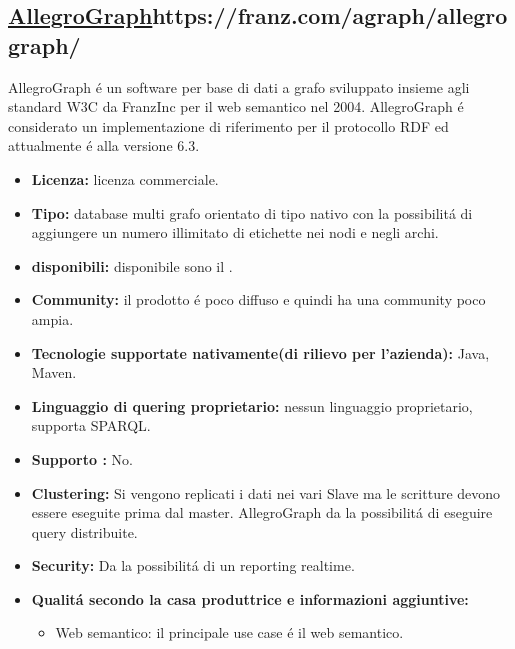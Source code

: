 \subsection{\url{AllegroGraph}{https://franz.com/agraph/allegrograph/}}
AllegroGraph \'e un software per base di dati a grafo  sviluppato insieme agli standard W3C da FranzInc per il web semantico nel 2004. AllegroGraph \'e considerato un implementazione di riferimento per il protocollo RDF ed attualmente \'e alla versione 6.3.
\begin{itemize}
\item \textbf{Licenza:} licenza commerciale.
\item \textbf{Tipo:} database multi grafo orientato di tipo nativo con la possibilit\'a di aggiungere un numero illimitato di etichette nei nodi e negli archi.
\item \textbf{ disponibili:} disponibile sono il .
\item \textbf{Community:} il prodotto \'e poco diffuso e quindi ha una community poco ampia.
\item \textbf{Tecnologie supportate nativamente(di rilievo per l'azienda):} Java, Maven. 
\item\textbf{Linguaggio di quering proprietario:} nessun linguaggio proprietario, supporta SPARQL.
\item\textbf{Supporto :} No.

\item\textbf{Clustering:} Si vengono replicati i dati nei vari Slave ma le scritture devono essere eseguite prima dal master. AllegroGraph da la possibilit\'a di eseguire query distribuite.
\item\textbf{Security:} Da la possibilit\'a di un reporting realtime.
\item\textbf{Qualit\'a secondo la casa produttrice e informazioni aggiuntive:} 
\begin{itemize}
\item{Web semantico:} il principale use case \'e il web semantico.
\end{itemize}
\end{itemize}


